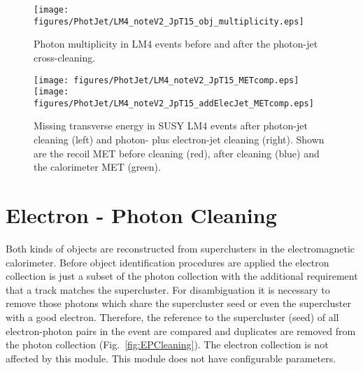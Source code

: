 \documentclass{cmspaper}
\begin{document}
\begin{figure}[hbtp]
  \begin{center}
      \texttt{[image: figures/PhotJet/LM4\_noteV2\_JpT15\_obj\_multiplicity.eps]}
    \caption{Photon multiplicity in LM4 events before and after the photon-jet
    cross-cleaning.}
    \label{fig:pjLM4mult}
  \end{center}
\end{figure}

\begin{figure}[hbtp]
  \begin{center}
      \texttt{[image: figures/PhotJet/LM4\_noteV2\_JpT15\_METcomp.eps]}
      \texttt{[image: figures/PhotJet/LM4\_noteV2\_JpT15\_addElecJet\_METcomp.eps]}
    \caption{Missing transverse energy in SUSY LM4 events after photon-jet
    cleaning (left) and photon- plus electron-jet cleaning (right). Shown are
    the recoil MET before cleaning (red), after cleaning (blue) and the
    calorimeter MET (green).}
    \label{fig:pjLM4MET}
  \end{center}
\end{figure}



\clearpage
\section{Electron - Photon Cleaning}
Both kinds of objects are reconstructed from superclusters in the
electromagnetic calorimeter. Before object identification procedures are
applied the electron collection is just a subset of the photon collection with
the additional requirement that a track matches the supercluster. For
disambiguation it is necessary to remove those photons which share the
supercluster seed or even the supercluster with a good electron.  Therefore, the
reference to the supercluster (seed) of all electron-photon pairs in the event
are compared and duplicates are removed from the photon collection
(Fig.~\ref{fig:EPCleaning}). The electron collection is not affected by this
module. This module does not have configurable parameters.
\end{document}
